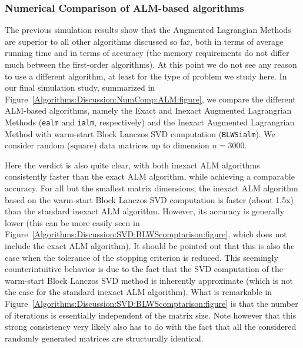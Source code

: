 \subsubsection{Numerical Comparison of ALM-based algorithms}
\label{Algorithms:Discussion:NumComp:ALG:ALM}

The previous simulation results show that the Augmented Lagrangian Methods are superior to all other algorithms discussed so far, both in terms of average running time and in terms of accuracy (the memory requirements do not differ much between the first-order algorithms). At this point we do not see any reason to use a different algorithm, at least for the type of problem we study here. In our final simulation study, summarized in Figure~\ref{Algorithms:Discussion:NumComp:ALM:figure}, we compare the different ALM-based algorithms, namely the Exact and Inexact Augmented Lagrangrian Methods (\texttt{ealm} and \texttt{ialm}, respectively) and the Inexact Augmented Lagrangrian Method with warm-start Block Lanczos SVD computation (\texttt{BLWSialm}). We consider random (square) data matrices up to dimension $n=3000$.

Here the verdict is also quite clear, with both inexact ALM algorithms consistently faster than the exact ALM algorithm, while achieving a comparable accuracy. For all but the smallest matrix dimensions, the inexact ALM algorithm based on the warm-start Block Lanczos SVD computation is faster (about 1.5x) than the standard inexact ALM algorithm. However, its accuracy is generally lower (this can be more easily seen in Figure~\ref{Algorithms:Discussion:SVD:BLWScomptarison:figure}, which does not include the exact ALM algorithm). It should be pointed out that this is also the case when the tolerance of the stopping criterion is reduced. This seemingly counterintuitive behavior is due to the fact that the SVD computation of the warm-start Block Lanczos SVD method is inherently approximate (which is not the case for the standard inexact ALM algorithm). What is remarkable in Figure~\ref{Algorithms:Discussion:SVD:BLWScomptarison:figure} is that the number of iterations is essentially independent of the matrix size. Note however that this strong consistency very likely also has to do with the fact that all the considered randomly generated matrices are structurally identical. 

